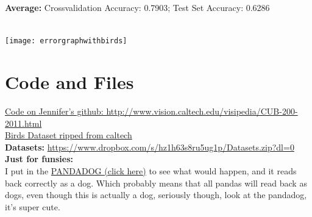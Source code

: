 \documentclass{article}
\begin{document}
	\textbf{Average:} Crossvalidation Accuracy: 0.7903;  Test Set Accuracy: 0.6286
	\\ \\

	\centerline{\texttt{[image: errorgraphwithbirds]}}

	\section{Code and Files}
	\setlength\parindent{34pt} \href{https://github.com/jenncheung/Advance-Machine-Learning-Project}{Code on Jennifer's github: http://www.vision.caltech.edu/visipedia/CUB-200-2011.html} \\
	\href{http://www.vision.caltech.edu/visipedia/CUB-200-2011.html}{Birds Dataset ripped from caltech}\\
	\textbf{Datasets:} \href{https://www.dropbox.com/s/hz1h63s8ru5ug1p/Datasets.zip?dl=0}{https://www.dropbox.com/s/hz1h63s8ru5ug1p/Datasets.zip?dl=0}\\
	\textbf{Just for funsies:} \\
	I put in the \href{http://guardianlv.com/wp-content/uploads/2014/05/The-Panda-Dog-Is-the-Newest-Rage-in-China.jpg}{PANDADOG (click here)} to see what would happen, and it reads back correctly as a dog.  Which probably means that all pandas will read back as dogs, even though this is actually a dog, seriously though, look at the pandadog, it's super cute.
\end{document}
